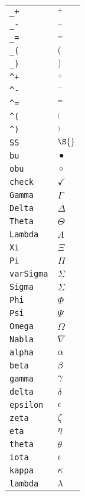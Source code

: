 \begin{longtable}{ll}
\texttt{\_+}&${}_+ {}$\\
\texttt{\_{-}}&${}_- {}$\\
\texttt{\_=}&${}_= {}$\\
\texttt{\_(}&${}( {}$\\
\texttt{\_)}&${}) {}$\\
\texttt{\textasciicircum +}&${}^+ {}$\\
\texttt{\textasciicircum {-}}&${}^- {}$\\
\texttt{\textasciicircum =}&${}^= {}$\\
\texttt{\textasciicircum (}&${}^( {}$\\
\texttt{\textasciicircum )}&${}^) {}$\\
\texttt{SS}&${}\S {}$\\
\texttt{bu}&${}\bullet {}$\\
\texttt{obu}&${}\circ {}$\\
\texttt{check}&${}\checkmark {}$\\
\texttt{Gamma}&${}\Gamma {}$\\
\texttt{Delta}&${}\Delta {}$\\
\texttt{Theta}&${}\Theta {}$\\
\texttt{Lambda}&${}\Lambda {}$\\
\texttt{Xi}&${}\Xi {}$\\
\texttt{Pi}&${}\Pi {}$\\
\texttt{varSigma}&${}\varSigma {}$\\
\texttt{Sigma}&${}\Sigma {}$\\
\texttt{Phi}&${}\Phi {}$\\
\texttt{Psi}&${}\Psi {}$\\
\texttt{Omega}&${}\Omega {}$\\
\texttt{Nabla}&${}\nabla {}$\\
\texttt{alpha}&${}\alpha {}$\\
\texttt{beta}&${}\beta {}$\\
\texttt{gamma}&${}\gamma {}$\\
\texttt{delta}&${}\delta {}$\\
\texttt{epsilon}&${}\epsilon {}$\\
\texttt{zeta}&${}\zeta {}$\\
\texttt{eta}&${}\eta {}$\\
\texttt{theta}&${}\theta {}$\\
\texttt{iota}&${}\iota {}$\\
\texttt{kappa}&${}\kappa {}$\\
\texttt{lambda}&${}\lambda {}$\\

\end{longtable}
